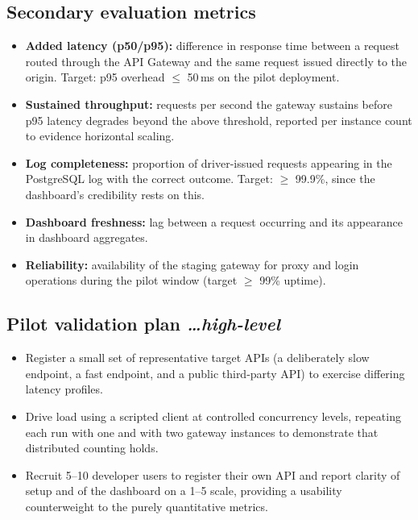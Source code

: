 \documentclass[11pt,a4paper]{article}
\newcommand{\BvrHint}[1]{%
  {\normalfont\normalsize\itshape\hfill #1}}
\begin{document}
\subsection{Secondary evaluation metrics}
\begin{itemize}[leftmargin=0.7cm]
    \item \textbf{Added latency (p50/p95):} difference in response time between
      a request routed through the API Gateway and the same request issued directly
      to the origin. Target: p95 overhead $\le$ 50\,ms on the pilot deployment.
    \item \textbf{Sustained throughput:} requests per second the gateway
      sustains before p95 latency degrades beyond the above threshold,
      reported per instance count to evidence horizontal scaling.
    \item \textbf{Log completeness:} proportion of driver-issued requests
      appearing in the PostgreSQL log with the correct outcome. Target:
      $\ge$ 99.9\%, since the dashboard's credibility rests on this.
    \item \textbf{Dashboard freshness:} lag between a request occurring and its
      appearance in dashboard aggregates.
    \item \textbf{Reliability:} availability of the staging gateway for proxy
      and login operations during the pilot window (target $\ge$ 99\% uptime).
\end{itemize}

\subsection{Pilot validation plan %
\BvrHint{\ldots high-level}}
\begin{itemize}[leftmargin=0.7cm]
    \item Register a small set of representative target APIs (a deliberately
      slow endpoint, a fast endpoint, and a public third-party API) to
      exercise differing latency profiles.
    \item Drive load using a scripted client at controlled concurrency levels,
      repeating each run with one and with two gateway instances to
      demonstrate that distributed counting holds.
    \item Recruit 5--10 developer users to register their own API and report
      clarity of setup and of the dashboard on a 1--5 scale, providing a
      usability counterweight to the purely quantitative metrics.
\end{itemize}
\end{document}

